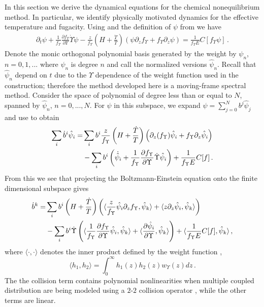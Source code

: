 
\label{dynamicsSec}
In this section we derive the dynamical equations for the chemical nonequilibrium method.  In particular, we identify physically motivated dynamics for the effective temperature and fugacity.  Using  and the definition of $\psi$ from  we have
\begin{align}\label{nearEquilibEq}
\partial_t \psi+\frac{1}{f_\Upsilon }\frac{\partial f_\Upsilon }{\partial\Upsilon}\dot\Upsilon\psi-\frac{z}{f_\Upsilon }\left(H+\frac{\dot{T}}{T}\right)\left(\psi\partial_zf_\Upsilon +f_\Upsilon \partial_z \psi\right)=\frac{1}{f_\Upsilon E}C[f_\Upsilon \psi]\,.
\end{align}
Denote the monic orthogonal polynomial basis generated by the weight  by $\psi_n$, $n=0,1,...$ where $\psi_n$ is degree $n$ and call the normalized versions  $\hat{\psi}_n$. Recall that $\hat\psi_n$ depend on $t$ due to the $\Upsilon$ dependence of the weight function used in the construction; therefore the method developed here is a moving-frame spectral method. Consider the space of polynomial of degree less than or equal to $N$, spanned by $\hat\psi_n$, $n=0,...,N$.   For $\psi$ in this subspace, we expand $\psi=\sum_{j=0}^Nb^j\hat\psi_j$ and use   to obtain
\begin{align}\label{Tvars}
\sum_i \dot{b}^i\hat\psi_i=&\sum_ib^i\frac{z}{f_\Upsilon }\left(H+\frac{\dot{T}}{T}\right)\left(\partial_z(f_\Upsilon )\hat\psi_i+f_\Upsilon \partial_z\hat\psi_i\right)\\
&-\sum_ib^i\left(\dot{\hat{\psi}}_i+\frac{1}{f_\Upsilon }\frac{\partial f_\Upsilon }{\partial\Upsilon}\dot\Upsilon\hat\psi_i\right)+\frac{1}{f_\Upsilon E}C[f]\,.
\notag
\end{align}
From this we see  that  projecting the Boltzmann-Einstein equation onto the finite dimensional subspace gives
\begin{align}
\dot b^k=& \sum_i b^i\left(H+\frac{\dot{T}}{T}\right)\left(\langle\frac{z}{f_\Upsilon }\hat\psi_i\partial_zf_\Upsilon ,\hat\psi_k\rangle+\langle z\partial_z \hat\psi_i,\hat\psi_k\rangle\right) \\
&-\sum_i b^i\dot{\Upsilon}\left(\langle\frac{1}{f_\Upsilon }\frac{\partial f_\Upsilon }{\partial\Upsilon}\hat\psi_i,\hat\psi_k\rangle+\langle\frac{\partial\hat{\psi}_i}{\partial \Upsilon},\hat\psi_k\rangle\right)+\langle\frac{1}{f_\Upsilon E}C[f],\hat\psi_k\rangle\notag\,,
\end{align}
where $\langle\cdot,\cdot\rangle$ denotes the inner product defined by the weight function ,
\begin{equation}
\langle h_1,h_2\rangle=\int_0^\infty h_1(z)h_2(z)w_\Upsilon(z)dz\,.
\end{equation}
The the collision term contains polynomial nonlinearities when multiple coupled distribution are being modeled using a $2$-$2$ collision operator , while the other terms are linear.  

